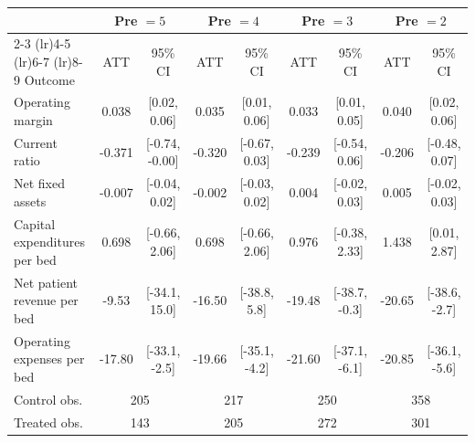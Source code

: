 \begin{tabular}{l cc cc cc cc}
\toprule
 & \multicolumn{2}{c}{Pre $= 5$} & \multicolumn{2}{c}{Pre $= 4$} & \multicolumn{2}{c}{Pre $= 3$} & \multicolumn{2}{c}{Pre $= 2$} \\
\cmidrule(lr){2-3} \cmidrule(lr){4-5} \cmidrule(lr){6-7} \cmidrule(lr){8-9}
Outcome & ATT & 95\% CI & ATT & 95\% CI & ATT & 95\% CI & ATT & 95\% CI \\
\midrule
Operating margin & 0.038 & [0.02, 0.06] & 0.035 & [0.01, 0.06] & 0.033 & [0.01, 0.05] & 0.040 & [0.02, 0.06] \\
Current ratio & -0.371 & [-0.74, -0.00] & -0.320 & [-0.67, 0.03] & -0.239 & [-0.54, 0.06] & -0.206 & [-0.48, 0.07] \\
Net fixed assets & -0.007 & [-0.04, 0.02] & -0.002 & [-0.03, 0.02] & 0.004 & [-0.02, 0.03] & 0.005 & [-0.02, 0.03] \\
Capital expenditures per bed & 0.698 & [-0.66, 2.06] & 0.698 & [-0.66, 2.06] & 0.976 & [-0.38, 2.33] & 1.438 & [0.01, 2.87] \\
Net patient revenue per bed & -9.53 & [-34.1, 15.0] & -16.50 & [-38.8, 5.8] & -19.48 & [-38.7, -0.3] & -20.65 & [-38.6, -2.7] \\
Operating expenses per bed & -17.80 & [-33.1, -2.5] & -19.66 & [-35.1, -4.2] & -21.60 & [-37.1, -6.1] & -20.85 & [-36.1, -5.6] \\
\midrule
Control obs. & \multicolumn{2}{c}{205} & \multicolumn{2}{c}{217} & \multicolumn{2}{c}{250} & \multicolumn{2}{c}{358} \\
Treated obs. & \multicolumn{2}{c}{143} & \multicolumn{2}{c}{205} & \multicolumn{2}{c}{272} & \multicolumn{2}{c}{301} \\
\bottomrule
\end{tabular}
